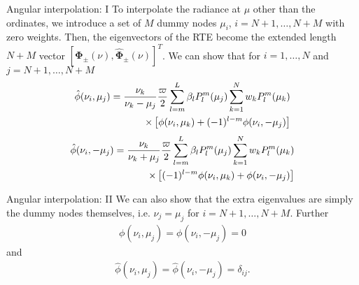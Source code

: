 \documentclass[14]{beamer}
\newcommand{\gvec}[1]{\boldsymbol{#1}}
\begin{document}
\begin{frame}{Angular interpolation: I}
  To interpolate the radiance at $\mu$ other than the ordinates, we
  introduce a set of $M$ dummy nodes $\mu_i$, $i=N+1,\ldots,N+M$ with
  zero weights. Then, the eigenvectors of the RTE become the extended
  length $N+M$ vector $[\gvec{\Phi}_\pm(\nu),
  \hat{\gvec{\Phi}}_\pm(\nu)]^T$. We can show that for $i=1,\ldots,N$
  and $j=N+1,\ldots,N+M$
  \begin{align}
    \hat{\phi}(\nu_i,\mu_j) = \frac{\nu_k}{\nu_k-\mu_j} \frac{\varpi}{2}
    \sum_{l=m}^L \beta_l P_l^m(\mu_j) \sum_{k=1}^N
    w_k P_l^m(\mu_k) \notag \\
    \times \left[
      \phi(\nu_i,\mu_k) + (-1)^{l-m}\phi(\nu_i,-\mu_j)
    \right]
    \end{align}
    \begin{align}
    \hat{\phi}(\nu_i,-\mu_j) = \frac{\nu_k}{\nu_k+\mu_j} \frac{\varpi}{2}
    \sum_{l=m}^L \beta_l P_l^m(\mu_j) \sum_{k=1}^N
    w_k P_l^m(\mu_k) \notag \\
    \times \left[
      (-1)^{l-m} \phi(\nu_i,\mu_k) + \phi(\nu_i,-\mu_j)
    \right]
  \end{align}
\end{frame}

\begin{frame}{Angular interpolation: II}
  We can also show that the extra eigenvalues are simply the dummy
  nodes themselves, i.e. $\nu_j = \mu_j$ for
  $i=N+1,\ldots,N+M$. Further
  \begin{align}
    \phi(\nu_i,\mu_j) = \phi(\nu_i,-\mu_j) = 0
  \end{align}
  and
  \begin{align}
    \hat{\phi}(\nu_i,\mu_j) = \hat{\phi}(\nu_i,-\mu_j) = \delta_{ij}.
  \end{align}
\end{frame}
\end{document}
